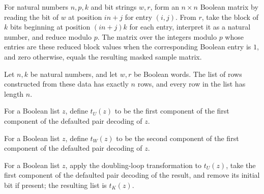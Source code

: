 \begin{theorem}
\label{Randomized.Matching.matOfRows_lovaszRows}
\leanok
{}
For natural numbers $n,p,k$ and bit strings $w,r$, form an $n\times n$ Boolean matrix by
reading the bit of $w$ at position $in+j$ for entry $(i,j)$. From $r$, take the block of
$k$ bits beginning at position $(in+j)k$ for each entry, interpret it as a natural
number, and reduce modulo $p$. The matrix over the integers modulo $p$ whose entries are
these reduced block values when the corresponding Boolean entry is $1$, and zero
otherwise, equals the resulting masked sample matrix.
\end{theorem}

\begin{theorem}
\label{Randomized.Matching.length_lovaszRows}
\leanok
{}
Let $n,k$ be natural numbers, and let $w,r$ be Boolean words. The list of rows
constructed from these data has exactly $n$ rows, and every row in the list has length
$n$.
\end{theorem}

\begin{definition}
\label{Randomized.Matching.tU}
\leanok
{}
For a Boolean list $z$, define $t_U(z)$ to be the first component of the first component
of the defaulted pair decoding of $z$.
\end{definition}

\begin{definition}
\label{Randomized.Matching.tW}
\leanok
{}
For a Boolean list $z$, define $t_W(z)$ to be the second component of the first
component of the defaulted pair decoding of $z$.
\end{definition}

\begin{definition}
\label{Randomized.Matching.tK}
\leanok
{}
For a Boolean list $z$, apply the doubling-loop transformation to $t_U(z)$, take the
first component of the defaulted pair decoding of the result, and remove its initial bit
if present; the resulting list is $t_K(z)$.
\end{definition}

